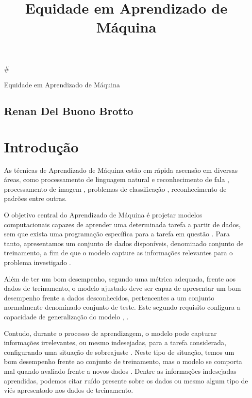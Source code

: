 \documentclass[11pt]{article}
\title{Equidade em Aprendizado de Máquina}
\begin{document}
    
    
    \maketitle
    
    

    
    \#

Equidade em Aprendizado de Máquina

\subsection{Renan Del Buono Brotto}\label{renan-del-buono-brotto}

\section{Introdução}\label{introduuxe7uxe3o}

As técnicas de Aprendizado de Máquina estão em rápida ascensão em
diversas áreas, como processamento de linguagem natural e reconhecimento
de fala \cite{Kamath2019}, processamento de imagem \cite{Cipolla2013},
problemas de classificação \cite{Duda2000}, reconhecimento de padrões
\cite{Bishop2006} entre outras.

O objetivo central do Aprendizado de Máquina é projetar modelos
computacionais capazes de aprender uma determinada tarefa a partir de
dados, sem que exista uma programação específica para a tarefa em
questão \cite{Samuel1959}. Para tanto, apresentamos um conjunto de dados
disponíveis, denominado conjunto de treinamento, a fim de que o modelo
capture as informações relevantes para o problema investigado
\cite{Hastie2009}.

Além de ter um bom desempenho, segundo uma métrica adequada, frente aos
dados de treinamento, o modelo ajustado deve ser capaz de apresentar um
bom desempenho frente a dados desconhecidos, pertencentes a um conjunto
normalmente denominado conjunto de teste. Este segundo requisito
configura a capacidade de generalização do modelo \cite{Bishop2006},
\cite{haykin-rn}.

Contudo, durante o processo de aprendizagem, o modelo pode capturar
informações irrelevantes, ou mesmo indesejadas, para a tarefa
considerada, configurando uma situação de sobreajuste \cite{haykin-rn}.
Neste tipo de situação, temos um bom desempenho frente ao conjunto de
treinamento, mas o modelo se comporta mal quando avaliado frente a novos
dados \cite{Bishop2006}. Dentre as informações indesejadas aprendidas,
podemos citar ruído presente sobre os dados \cite{Bishop2006} ou mesmo
algum tipo de viés apresentado nos dados de treinamento.
\end{document}
